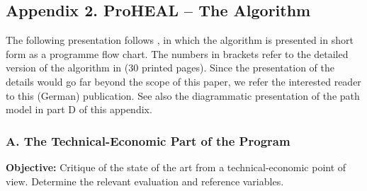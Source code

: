 \documentclass[12pt,a4paper]{article}
\begin{document}
\subsection*{Appendix 2. ProHEAL – The Algorithm}

The following presentation follows \cite[Appendix]{13}, in which the algorithm
is presented in short form as a programme flow chart. The numbers in brackets
refer to the detailed version of the algorithm in \cite[ch. 3]{15} (30 printed
pages). Since the presentation of the details would go far beyond the scope of
this paper, we refer the interested reader to this (German) publication.  See
also the diagrammatic presentation of the path model in part D of this
appendix.

\subsubsection*{A. The Technical-Economic Part of the Program}

\textbf{Objective:} Critique of the state of the art from a technical-economic
point of view. Determine the relevant evaluation and reference variables.
\end{document}
